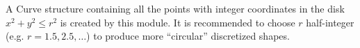 A Curve structure containing all the points with integer coordinates in
the disk $x^2+y^2 \leq r^2$ is created by this module.
It is recommended to choose $r$ half-integer 
(e.g. $r=1.5, 2.5, \ldots$) to produce more ``circular'' discretized shapes.
